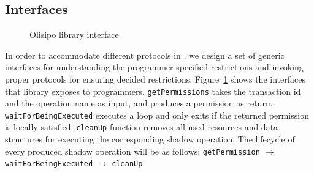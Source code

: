 

\subsection{Interfaces}
\begin{figure}[t!]
\centering
\begin{minipage}[t]{1.0\columnwidth}
\end{minipage}
\caption{Olisipo library interface}
\label{fig:por:olisipinterface}
\end{figure}
In order to accommodate different protocols in \coordtool, we design a set of generic interfaces
for understanding the programmer specified restrictions and invoking proper protocols for ensuring
decided restrictions. Figure~\ref{fig:por:olisipinterface} shows the interfaces that library exposes to programmers. 
{\tt getPermissions} takes the transaction id and the operation name as input, and produces a permission as return.
{\tt waitForBeingExecuted} executes a loop and only exits if the returned permission is locally satisfied. {\tt cleanUp}
function removes all used resources and data structures for executing the corresponding shadow operation. The lifecycle of
every produced shadow operation will be as follows: {\tt getPermission} $\rightarrow$ {\tt waitForBeingExecuted} $\rightarrow$ {\tt cleanUp}.


